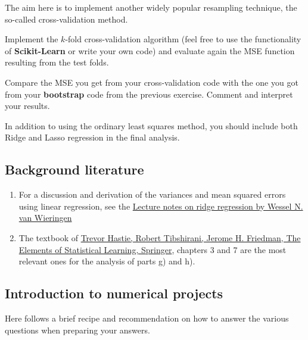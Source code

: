 \documentclass[11pt]{article}
\begin{document}
The aim here is to implement another widely popular resampling
technique, the so-called cross-validation method.

Implement the \(k\)-fold cross-validation algorithm (feel free to use
the functionality of \textbf{Scikit-Learn} or write your own code) and
evaluate again the MSE function resulting from the test folds.

Compare the MSE you get from your cross-validation code with the one you
got from your \textbf{bootstrap} code from the previous exercise.
Comment and interpret your results.

In addition to using the ordinary least squares method, you should
include both Ridge and Lasso regression in the final analysis.

    \hypertarget{background-literature}{%
\subsection*{Background literature}\label{background-literature}}

\begin{enumerate}
\def\labelenumi{\arabic{enumi}.}
\item
  For a discussion and derivation of the variances and mean squared
  errors using linear regression, see the
  \href{https://arxiv.org/abs/1509.09169}{Lecture notes on ridge
  regression by Wessel N. van Wieringen}
\item
  The textbook of
  \href{https://www.springer.com/gp/book/9780387848570}{Trevor Hastie,
  Robert Tibshirani, Jerome H. Friedman, The Elements of Statistical
  Learning, Springer}, chapters 3 and 7 are the most relevant ones for
  the analysis of parts g) and h).
\end{enumerate}

    \hypertarget{introduction-to-numerical-projects}{%
\subsection*{Introduction to numerical
projects}\label{introduction-to-numerical-projects}}

Here follows a brief recipe and recommendation on how to answer the
various questions when preparing your answers.
\end{document}
